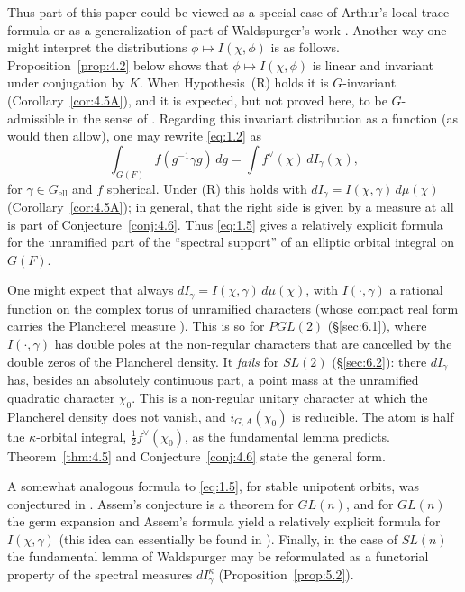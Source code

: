 \documentclass[12pt,letterpaper]{article}
\numberwithin{equation}{section}
\theoremstyle{plain}
\theoremstyle{remark}
\theoremstyle{plain}
\theoremstyle{definition}
\theoremstyle{remark}
\theoremstyle{remark}
\newcommand{\ellr}{\mathrm{ell}}
\begin{document}
Thus part of this paper could be viewed as a special case of Arthur's local trace formula or as a generalization of part of Waldspurger's work \cite{Wa89a}. Another way one might interpret the distributions $\phi\mapsto I(\chi,\phi)$ is as follows. Proposition~\ref{prop:4.2} below shows that $\phi\longmapsto I(\chi,\phi)$ is linear and invariant under conjugation by $K$. When Hypothesis~(R) holds it is $G$-invariant (Corollary~\ref{cor:4.5A}), and it is expected, but not proved here, to be $G$-admissible in the sense of \cite{HC78}. Regarding this invariant distribution as a function (as \cite[Theorem 19]{HC78} would then allow), one may rewrite \eqref{eq:1.2} as
\begin{equation}\label{eq:1.5}
\int_{G(F)}f(g^{-1}\gamma g)\,dg=\int f^\vee(\chi)\,dI_\gamma(\chi),
\end{equation}
for $\gamma\in G_{\ellr}$ and $f$ spherical. Under (R) this holds with $dI_\gamma=I(\chi,\gamma)\,d\mu(\chi)$ (Corollary~\ref{cor:4.5A}); in general, that the right side is given by a measure at all is part of Conjecture~\ref{conj:4.6}. Thus \eqref{eq:1.5} gives a relatively explicit formula for the unramified part of the ``spectral support'' of an elliptic orbital integral on $G(F)$.

One might expect that always $dI_\gamma=I(\chi,\gamma)\,d\mu(\chi)$, with $I(\cdot,\gamma)$ a rational function on the complex torus of unramified characters (whose compact real form carries the Plancherel measure \cite{Ma71}). This is so for $PGL(2)$ (\S\ref{sec:6.1}), where $I(\cdot,\gamma)$ has double poles at the non-regular characters that are cancelled by the double zeros of the Plancherel density. It \emph{fails} for $SL(2)$ (\S\ref{sec:6.2}): there $dI_\gamma$ has, besides an absolutely continuous part, a point mass at the unramified quadratic character $\chi_0$. This is a non-regular unitary character at which the Plancherel density does not vanish, and $i_{G,A}(\chi_0)$ is reducible. The atom is half the $\kappa$-orbital integral, $\tfrac12 f^\vee(\chi_0)$, as the fundamental lemma predicts. Theorem~\ref{thm:4.5} and Conjecture~\ref{conj:4.6} state the general form.

A somewhat analogous formula to \eqref{eq:1.5}, for stable unipotent orbits, was conjectured in \cite{As91}. Assem's conjecture is a theorem for $GL(n)$, and for $GL(n)$ the germ expansion and Assem's formula yield a relatively explicit formula for $I(\chi,\gamma)$ (this idea can essentially be found in \cite{Wa89a}). Finally, in the case of $SL(n)$ the fundamental lemma of Waldspurger \cite{Wa91} may be reformulated as a functorial property of the spectral measures $dI^\kappa_\gamma$ (Proposition~\ref{prop:5.2}).
\end{document}
